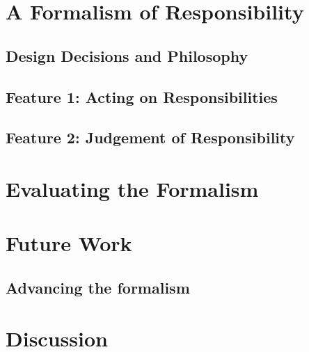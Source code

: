 \section{A Formalism of Responsibility}

\subsection{Design Decisions and Philosophy}

\subsection{Feature 1: Acting on Responsibilities}

\subsection{Feature 2: Judgement of Responsibility}


\section{Evaluating the Formalism}


\section{Future Work}

\subsection{Advancing the formalism}


\section{Discussion}






